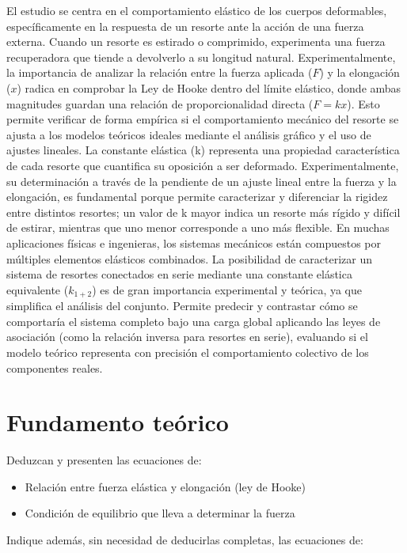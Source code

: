 \documentclass[12pt,a4paper]{article}
\begin{document}
El estudio se centra en el comportamiento elástico de los cuerpos deformables, específicamente en la respuesta de un resorte ante la acción de una fuerza externa. Cuando un resorte es estirado o comprimido, experimenta una fuerza recuperadora que tiende a devolverlo a su longitud natural. Experimentalmente, la importancia de analizar la relación entre la fuerza aplicada ($F$) y la elongación ($x$) radica en comprobar la Ley de Hooke dentro del límite elástico, donde ambas magnitudes guardan una relación de proporcionalidad directa ($F = kx$). Esto permite verificar de forma empírica si el comportamiento mecánico del resorte se ajusta a los modelos teóricos ideales mediante el análisis gráfico y el uso de ajustes lineales.
La constante elástica (k) representa una propiedad característica de cada resorte que cuantifica su oposición a ser deformado. Experimentalmente, su determinación a través de la pendiente de un ajuste lineal entre la fuerza y la elongación, es fundamental porque permite caracterizar y diferenciar la rigidez entre distintos resortes; un valor de k mayor indica un resorte más rígido y difícil de estirar, mientras que uno menor corresponde a uno más flexible.
En muchas aplicaciones físicas e ingenieras, los sistemas mecánicos están compuestos por múltiples elementos elásticos combinados. La posibilidad de caracterizar un sistema de resortes conectados en serie mediante una constante elástica equivalente ($k_{1+2}$) es de gran importancia experimental y teórica, ya que simplifica el análisis del conjunto. Permite predecir y contrastar cómo se comportaría el sistema completo bajo una carga global aplicando las leyes de asociación (como la relación inversa para resortes en serie), evaluando si el modelo teórico representa con precisión el comportamiento colectivo de los componentes reales.

\section{Fundamento teórico}

Deduzcan y presenten las ecuaciones de:

\begin{itemize}
    \item Relación entre fuerza elástica y elongación (ley de Hooke)
    \item Condición de equilibrio que lleva a determinar la fuerza
\end{itemize}

Indique además, sin necesidad de deducirlas completas, las ecuaciones de:
\end{document}
